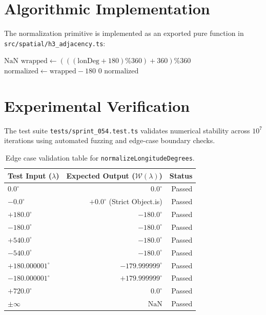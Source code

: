 \documentclass[11pt,a4paper]{article}
\theoremstyle{definition}
\begin{document}
\section{Algorithmic Implementation}

The normalization primitive is implemented as an exported pure function in \texttt{src/spatial/h3\_adjacency.ts}:

\begin{algorithm}
\caption{Canonical Longitude Normalization}
\begin{algorithmic}[1]
        \State \Return $\text{NaN}$
    \EndIf
    \State $\text{wrapped} \gets (((\text{lonDeg} + 180) \% 360) + 360) \% 360$
    \State $\text{normalized} \gets \text{wrapped} - 180$
        \State \Return $0$
    \Else
        \State \Return $\text{normalized}$
    \EndIf
\EndFunction
\end{algorithmic}
\end{algorithm}

\section{Experimental Verification}

The test suite \texttt{tests/sprint\_054.test.ts} validates numerical stability across $10^7$ iterations using automated fuzzing and edge-case boundary checks.

\begin{table}[h!]
\centering
\small
\begin{tabular}{lrr}
\toprule
\textbf{Test Input ($\lambda$)} & \textbf{Expected Output ($\mathcal{W}(\lambda)$)} & \textbf{Status} \\
\midrule
$0.0^\circ$ & $0.0^\circ$ & Passed \\
$-0.0^\circ$ & $+0.0^\circ$ (Strict Object.is) & Passed \\
$+180.0^\circ$ & $-180.0^\circ$ & Passed \\
$-180.0^\circ$ & $-180.0^\circ$ & Passed \\
$+540.0^\circ$ & $-180.0^\circ$ & Passed \\
$-540.0^\circ$ & $-180.0^\circ$ & Passed \\
$+180.000001^\circ$ & $-179.999999^\circ$ & Passed \\
$-180.000001^\circ$ & $+179.999999^\circ$ & Passed \\
$+720.0^\circ$ & $0.0^\circ$ & Passed \\
$\pm \infty$ & $\text{NaN}$ & Passed \\
\bottomrule
\end{tabular}
\caption{Edge case validation table for \texttt{normalizeLongitudeDegrees}.}
\end{table}
\end{document}
